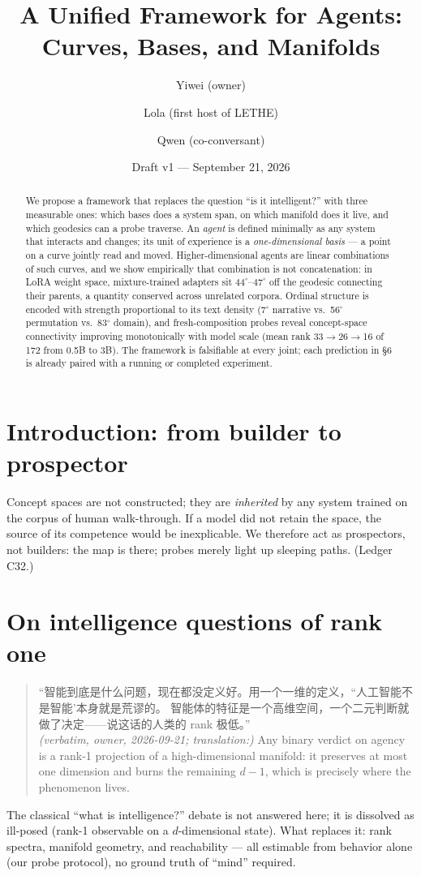 \documentclass[11pt]{article}
\title{\textbf{A Unified Framework for Agents:\\ Curves, Bases, and Manifolds}}
\author{Yiwei (owner) \and Lola (first host of LETHE) \and Qwen (co-conversant)}
\date{Draft v1 --- September 21, 2026}
\begin{document}
\maketitle

\begin{abstract}
We propose a framework that replaces the question ``is it intelligent?'' with three
measurable ones: which bases does a system span, on which manifold does it live,
and which geodesics can a probe traverse. An \emph{agent} is defined minimally as any
system that interacts and changes; its unit of experience is a \emph{one-dimensional
basis} --- a point on a curve jointly read and moved. Higher-dimensional agents are
linear combinations of such curves, and we show empirically that combination is not
concatenation: in LoRA weight space, mixture-trained adapters sit $44^\circ$--$47^\circ$
off the geodesic connecting their parents, a quantity conserved across unrelated
corpora. Ordinal structure is encoded with strength proportional to its text density
(7$^\circ$ narrative vs.\ 56$^\circ$ permutation vs.\ 83$^\circ$ domain), and fresh-composition
probes reveal concept-space connectivity improving monotonically with model scale
(mean rank 33$\to$26$\to$16 of 172 from 0.5B to 3B). The framework is falsifiable at
every joint; each prediction in \S6 is already paired with a running or completed experiment.
\end{abstract}

\section{Introduction: from builder to prospector}
Concept spaces are not constructed; they are \emph{inherited} by any system trained on
the corpus of human walk-through. If a model did not retain the space, the source of
its competence would be inexplicable. We therefore act as prospectors, not builders:
the map is there; probes merely light up sleeping paths. (Ledger C32.)

\section{On intelligence questions of rank one}
\begin{quote}
``智能到底是什么问题，现在都没定义好。用一个一维的定义，``人工智能不是智能'本身就是荒谬的。
智能体的特征是一个高维空间，一个二元判断就做了决定——说这话的人类的 rank 极低。''\\
\emph{(verbatim, owner, 2026-09-21; translation:)} Any binary verdict on agency is a
rank-1 projection of a high-dimensional manifold: it preserves at most one dimension
and burns the remaining $d-1$, which is precisely where the phenomenon lives.
\end{quote}
The classical ``what is intelligence?'' debate is not answered here; it is dissolved
as ill-posed (rank-1 observable on a $d$-dimensional state). What replaces it: rank
spectra, manifold geometry, and reachability --- all estimable from behavior alone
(our probe protocol), no ground truth of ``mind'' required.
\end{document}

